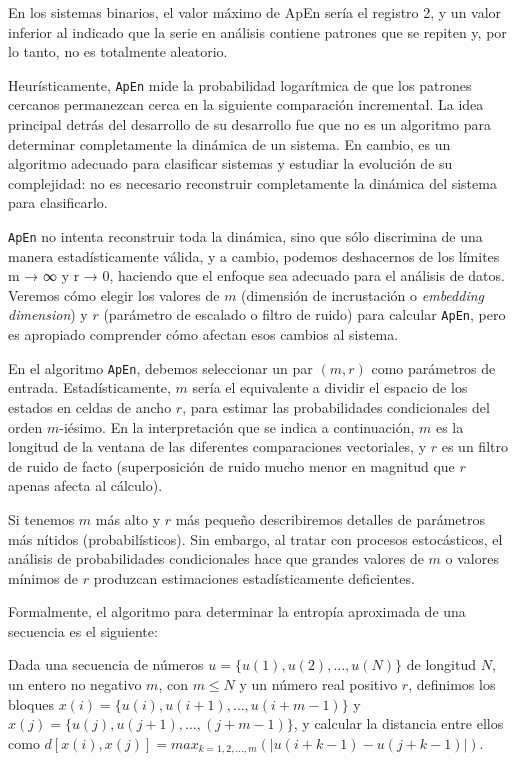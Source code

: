 \documentclass[a4paper,12pt]{article}
\begin{document}
En los sistemas binarios, el valor máximo de ApEn sería el registro 2, y un valor inferior al indicado que la serie en análisis contiene patrones que se repiten y, por lo tanto, no es totalmente aleatorio.

Heurísticamente, \texttt{ApEn} mide la probabilidad logarítmica de que los patrones cercanos permanezcan cerca en la siguiente comparación incremental. La idea principal detrás del desarrollo de su desarrollo fue que no es un algoritmo para determinar completamente la dinámica de un sistema. En cambio, es un algoritmo adecuado para clasificar sistemas y estudiar la evolución de su complejidad: no es necesario reconstruir completamente la dinámica del sistema para clasificarlo. 

\texttt{ApEn} no intenta reconstruir toda la dinámica, sino que sólo discrimina de una manera estadísticamente válida, y a cambio, podemos deshacernos de los límites m → ∞ y r → 0, haciendo que el enfoque sea adecuado para el análisis de datos. Veremos cómo elegir los valores de $m$ (dimensión de incrustación o \textit{embedding dimension}) y $r$ (parámetro de escalado o filtro de ruido) para calcular \texttt{ApEn}, pero es apropiado comprender cómo afectan esos cambios al sistema. 

En el algoritmo \texttt{ApEn}, debemos seleccionar un par $(m, r)$ como parámetros de entrada. Estadísticamente, $m$ sería el equivalente a dividir el espacio de los estados en celdas de ancho $r$, para estimar las probabilidades condicionales del orden $m$-iésimo. En la interpretación que se indica a continuación, $m$ es la longitud de la ventana de las diferentes comparaciones vectoriales, y $r$ es un filtro de ruido de facto (superposición de ruido mucho menor en magnitud que $r$ apenas afecta al cálculo). 

Si tenemos $m$ más alto y $r$ más pequeño describiremos detalles de parámetros más nítidos (probabilísticos). Sin embargo, al tratar con procesos estocásticos, el análisis de probabilidades condicionales hace que grandes valores de $m$ o valores mínimos de $r$ produzcan estimaciones estadísticamente deficientes. 

Formalmente, el algoritmo para determinar la entropía aproximada de una secuencia es el siguiente: 

Dada una secuencia de números $u = \{u(1), u(2), \dots, u( N)\}$ de longitud $N$, un entero no negativo $m$, con $m \leq N$ y un número real positivo $r$, definimos los bloques $x(i) = \{u(i), u(i + 1), \dots, u(i + m - 1)\}$ y $x(j) = \{u(j), u(j+1), \dots, (j + m - 1)\}$, y calcular la distancia entre ellos como $d[x(i), x(j)] = max_{k=1,2, \dots,m}(|u(i + k - 1) - u( j + k - 1)|)$. 
\end{document}
